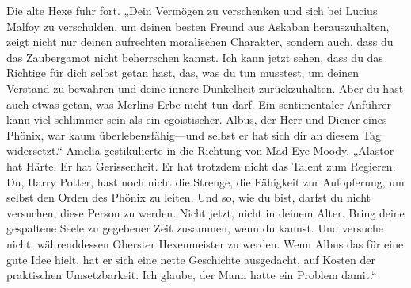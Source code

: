Die alte Hexe fuhr fort.
„Dein Vermögen zu verschenken und sich bei Lucius Malfoy zu verschulden, um deinen besten Freund aus Askaban herauszuhalten, zeigt nicht nur deinen aufrechten moralischen Charakter, sondern auch, dass du das Zaubergamot nicht beherrschen kannst. Ich kann jetzt sehen, dass du das Richtige für dich selbst getan hast, das, was du tun musstest, um deinen Verstand zu bewahren und deine innere Dunkelheit zurückzuhalten. Aber du hast auch etwas getan, was Merlins Erbe nicht tun darf. Ein sentimentaler Anführer kann viel schlimmer sein als ein egoistischer. Albus, der Herr und Diener eines Phönix, war kaum überlebensfähig—und selbst er hat sich dir an diesem Tag widersetzt.“
Amelia gestikulierte in die Richtung von Mad-Eye Moody.
„Alastor hat Härte. Er hat Gerissenheit. Er hat trotzdem nicht das Talent zum Regieren. Du, Harry Potter, hast noch nicht die Strenge, die Fähigkeit zur Aufopferung, um selbst den Orden des Phönix zu leiten. Und so, wie du bist, darfst du nicht versuchen, diese Person zu werden. Nicht jetzt, nicht in deinem Alter. Bring deine gespaltene Seele zu gegebener Zeit zusammen, wenn du kannst. Und versuche nicht, währenddessen Oberster Hexenmeister zu werden. Wenn Albus das für eine gute Idee hielt, hat er sich eine nette Geschichte ausgedacht, auf Kosten der praktischen Umsetzbarkeit. Ich glaube, der Mann hatte ein Problem damit.“

